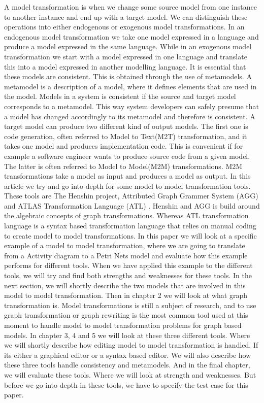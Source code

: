 A model transformation is when we change some source model from one
instance to another instance and end up with a target model. We can
distinguish these operations into either endogenous or exogenous model
transformations. In an endogenous model transformation we take one model
expressed in a language and produce a model expressed in the same language.
While in an exogenous model transformation we start with a model
expressed in one language and translate this into a model expressed in another
modelling language. It is essential that these models are consistent. This is
obtained through the use of metamodels. A metamodel is a description of a
model, where it defines elements that are used in the model. Models in a system
is consistent if the source and target model corresponds to a metamodel. This
way system developers can safely presume that a model has changed accordingly
to its metamodel and therefore is consistent. A target model can produce two
different kind of output models. The first one is code generation, often
referred to Model to Text(M2T) transformation, and it takes one model and
produces implementation code. This is convenient if for example a software
engineer wants to produce source code from a given model. The latter is often
referred to Model to Model(M2M) transformations. M2M transformations take a
model as input and produces a model as output. In this article we try and go
into depth for some model to model transformation tools. These tools are
The Henshin project\cite{Henshin}, Attributed Graph Grammer System (AGG)
\cite{AGG} and ATLAS Transformation Language (ATL) \cite{ATL}. Henshin and AGG
is build around the algebraic concepts of graph transformations. Whereas ATL
transformation language is a syntax based transformation language that relies
on manual coding to create model to model transformations. In this paper we
will look at a specific example of a model to model transformation, where we
are going to translate from a Activity diagram to a Petri Nets model and
evaluate how this example performs for different tools. When we have applied
this example to the different tools, we will try and find both strengths and
weaknesses for these tools. In the next section, we will shortly describe the
two models that are involved in this model to model transformation. Then in
chapter 2 we will look at what graph transformation is. Model transformations
is still a subject of research, and to use graph transformation or graph
rewriting is the most common tool used at this moment to handle model to model
transformation problems for graph based models. In chapter 3, 4 and 5 we will
look at these three different tools. Where we will shortly describe how editing
model to model transformation is handled. If its either a graphical editor or a
syntax based editor. We will also describe how these three tools handle
consistency and metamodels. And in the final chapter, we will evaluate these
tools. Where we will look at strength and weaknesses. But before we go into
depth in these tools, we have to specify the test case for this paper.

